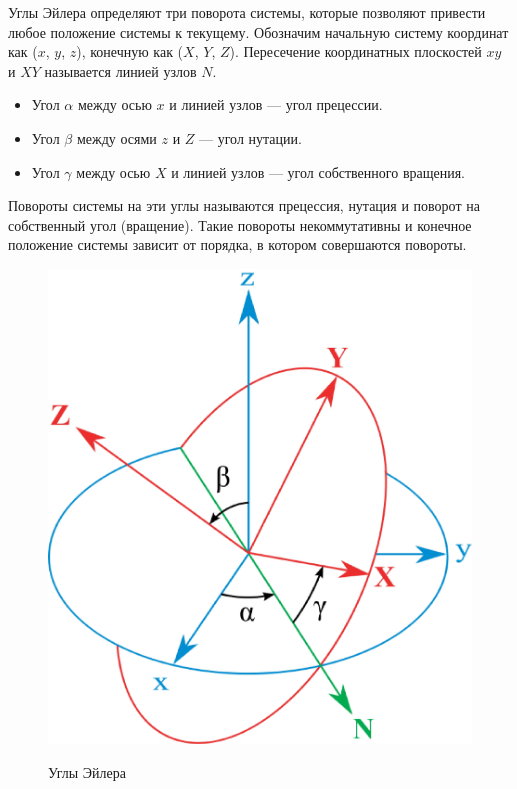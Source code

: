 Углы Эйлера определяют три поворота системы\cite[79]{Berezkin}, которые позволяют привести любое положение системы к текущему.
Обозначим начальную систему координат как ($x$, $y$, $z$), конечную как ($X$, $Y$, $Z$).
Пересечение координатных плоскостей $xy$ и $XY$ называется линией узлов $N$.
\begin{itemize}
  \item Угол $\alpha$ между осью $x$ и линией узлов --- угол прецессии.
  \item Угол $\beta$ между осями $z$ и $Z$ --- угол нутации.
  \item Угол $\gamma$ между осью $X$ и линией узлов --- угол собственного вращения.
\end{itemize}
  
Повороты системы на эти углы называются прецессия, нутация и поворот на собственный угол (вращение).
Такие повороты некоммутативны и конечное положение системы зависит от порядка, в котором совершаются повороты. 

\begin{figure}[ht!]
\begin{center}
\includegraphics[scale=0.25]{./Rigidbody/Eulerangles.eps}  \\
\caption{Углы Эйлера}\label{Eulerangles}
\end{center}
\end{figure}

